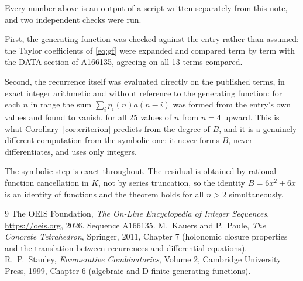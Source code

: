 \documentclass[11pt,a4paper]{article}
\theoremstyle{plain}
\theoremstyle{definition}
\begin{document}
Every number above is an output of a script written separately from this note, and two
independent checks were run.

First, the generating function was checked against the entry rather than assumed: the
Taylor coefficients of \eqref{eq:gf} were expanded and compared term by term with the DATA
section of A166135, agreeing on all 13 terms compared.

Second, the recurrence itself was evaluated directly on the published terms, in exact
integer arithmetic and without reference to the generating function: for each $n$ in range
the sum $\sum_{i}p_{i}(n)a(n-i)$ was formed from the entry's own values and found to
vanish, for all 25 values of $n$ from $n=4$ upward. This is what
Corollary~\ref{cor:criterion} predicts from the degree of $B$, and it is a genuinely
different computation from the symbolic one: it never forms $B$, never differentiates, and
uses only integers.

The symbolic step is exact throughout. The residual is obtained by rational-function
cancellation in $K$, not by series truncation, so the identity $B=6 x^{2} + 6 x$ is an
identity of functions and the theorem holds for all $n>2$ simultaneously.

\begin{thebibliography}{9}
 The OEIS Foundation, \emph{The On-Line Encyclopedia of Integer Sequences},
\url{https://oeis.org}, 2026. Sequence A166135.
 M.~Kauers and P.~Paule, \emph{The Concrete Tetrahedron}, Springer, 2011,
Chapter 7 (holonomic closure properties and the translation between recurrences and
differential equations).
 R.~P.~Stanley, \emph{Enumerative Combinatorics}, Volume 2, Cambridge
University Press, 1999, Chapter 6 (algebraic and D-finite generating functions).
\end{thebibliography}
\end{document}
